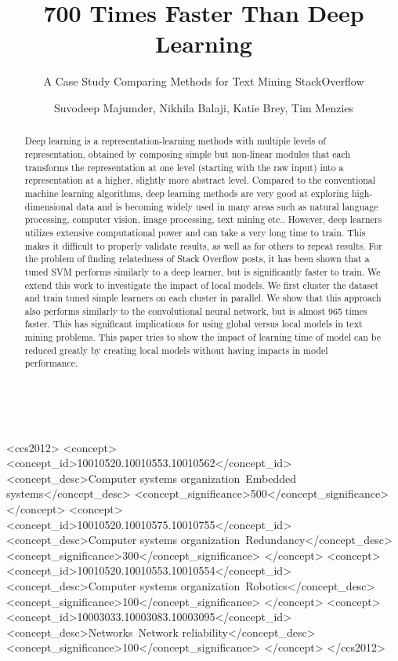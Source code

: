 \documentclass[sigconf]{acmart}
\theoremstyle{break}
\begin{document}
\title{700 Times Faster Than Deep Learning} 
\subtitle{A Case Study Comparing   Methods for Text Mining StackOverflow}


\author{Suvodeep Majumder, Nikhila Balaji, Katie Brey, Tim Menzies}  
~~~

 
 

\renewcommand{\shortauthors}{S. Majumder et al.}


\begin{abstract}
Deep learning is a representation-learning methods with multiple levels of representation, obtained by composing simple but non-linear modules that each transforms the representation at one level (starting with the raw input) into a representation at a higher, slightly more abstract level. Compared to the conventional machine learning algorithms, deep learning methods are very good at exploring high-dimensional data and is becoming widely used in many areas such as natural language processing, computer vision, image processing, text mining etc.. However, deep learners utilizes extensive computational power and can take a very long time to train. This makes it difficult to properly validate results, as well as for others to repeat results. For the problem of finding relatedness of Stack Overflow posts, it has been shown that a tuned SVM performs similarly to a deep learner, but is significantly faster to train. We extend this work to investigate the impact of local models. We first cluster the dataset and train tuned simple learners on each cluster in parallel. We show that this approach also performs similarly to the convolutional neural network, but is almost 965 times faster. This has significant implications for using global versus local models in  text mining problems. This paper tries to show the impact of learning time of model can be reduced greatly by creating local models without having impacts in model performance.
\end{abstract}

%
%
\begin{CCSXML}
<ccs2012>
 <concept>
  <concept_id>10010520.10010553.10010562</concept_id>
  <concept_desc>Computer systems organization~Embedded systems</concept_desc>
  <concept_significance>500</concept_significance>
 </concept>
 <concept>
  <concept_id>10010520.10010575.10010755</concept_id>
  <concept_desc>Computer systems organization~Redundancy</concept_desc>
  <concept_significance>300</concept_significance>
 </concept>
 <concept>
  <concept_id>10010520.10010553.10010554</concept_id>
  <concept_desc>Computer systems organization~Robotics</concept_desc>
  <concept_significance>100</concept_significance>
 </concept>
 <concept>
  <concept_id>10003033.10003083.10003095</concept_id>
  <concept_desc>Networks~Network reliability</concept_desc>
  <concept_significance>100</concept_significance>
 </concept>
</ccs2012>  
\end{CCSXML}
\end{document}
